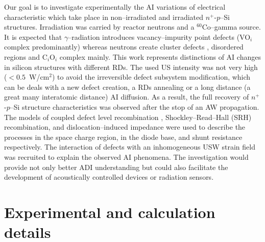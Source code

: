 \documentclass[aip,jap, amsmath,amssymb,reprint]{revtex4-1}
\begin{document}
Our goal is to investigate experimentally the AI variations of electrical characteristic which take place in non--irradiated and irradiated $n^+$-$p$--Si structures.
Irradiation was carried by reactor neutrons and a $^{60}$Co--gamma source.
It is expected that $\gamma$--radiation introduces vacancy--impurity point defects (VO$_i$ complex predominantly) \cite{NIEL:Jafari,Gamma:Prabhakara,NIEL:Moll}
whereas neutrons create cluster defects \cite{Rew:Srour,Pintilie}, disordered regions \cite{Neutron:Arutyunov} and C$_i$O$_i$ complex  \cite{NIEL:Moll,neutron:Londos} mainly.
This work represents distinctions of AI changes in silicon structures with different RDs.
The used US intensity was not very high ($<0.5$~W/cm$^2$) to avoid the irreversible defect subsystem modification, which can be deals with a new defect creation, a RDs annealing or a long distance (a great many interatomic distance) AI diffusion.
As a result, the full recovery of $n^+$-$p$--Si structure characteristics was observed after the stop of an AW propagation.
The models of coupled defect level recombination \cite{CDLR:JAP1995,CDLR:JAP}, Shockley--Read--Hall (SRH) recombination, and dislocation--induced impedance \cite{Rsh:Gopal2003,Rsh:Gopal2004} were used to describe the processes in the space charge region,  in the diode base, and shunt resistance respectively.
The interaction of defects with an inhomogeneous USW strain field \cite{MirzadeJAP2011,PeleshchakUJF2016} was recruited to explain the observed AI phenomena.
The investigation would provide not only better ADI understanding but could also facilitate the development of acoustically controlled devices or radiation sensors.



\section{Experimental and calculation details}
\end{document}
